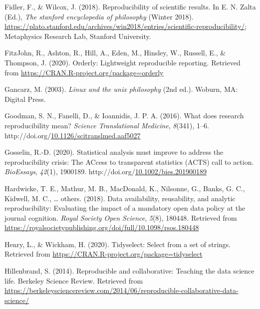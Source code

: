 \documentclass[12pt,twoside]{reedthesis}
\newenvironment{CSLReferences}%
  {}%
  {\par}
\begin{document}
\begin{CSLReferences}{1}{0}
\leavevmode\hypertarget{ref-sep-scientific-reproducibility}{}%
Fidler, F., \& Wilcox, J. (2018). Reproducibility of scientific results. In E. N. Zalta (Ed.), \emph{The stanford encyclopedia of philosophy} (Winter 2018). \url{https://plato.stanford.edu/archives/win2018/entries/scientific-reproducibility/}; Metaphysics Research Lab, Stanford University.

\leavevmode\hypertarget{ref-R-orderly}{}%
FitzJohn, R., Ashton, R., Hill, A., Eden, M., Hinsley, W., Russell, E., \& Thompson, J. (2020). Orderly: Lightweight reproducible reporting. Retrieved from \url{https://CRAN.R-project.org/package=orderly}

\leavevmode\hypertarget{ref-unix}{}%
Gancarz, M. (2003). \emph{Linux and the unix philosophy} (2nd ed.). Woburn, MA: Digital Press.

\leavevmode\hypertarget{ref-Goodman341ps12}{}%
Goodman, S. N., Fanelli, D., \& Ioannidis, J. P. A. (2016). What does research reproducibility mean? \emph{Science Translational Medicine}, \emph{8}(341), 1--6. http://doi.org/\href{https://doi.org/10.1126/scitranslmed.aaf5027}{10.1126/scitranslmed.aaf5027}

\leavevmode\hypertarget{ref-bioessays-gosselin}{}%
Gosselin, R.-D. (2020). Statistical analysis must improve to address the reproducibility crisis: The ACcess to transparent statistics (ACTS) call to action. \emph{BioEssays}, \emph{42}(1), 1900189. http://doi.org/\href{https://doi.org/10.1002/bies.201900189}{10.1002/bies.201900189}

\leavevmode\hypertarget{ref-hardwicke2018data}{}%
Hardwicke, T. E., Mathur, M. B., MacDonald, K., Nilsonne, G., Banks, G. C., Kidwell, M. C., \ldots{} others. (2018). Data availability, reusability, and analytic reproducibility: Evaluating the impact of a mandatory open data policy at the journal cognition. \emph{Royal Society Open Science}, \emph{5}(8), 180448. Retrieved from \url{https://royalsocietypublishing.org/doi/full/10.1098/rsos.180448}

\leavevmode\hypertarget{ref-R-tidyselect}{}%
Henry, L., \& Wickham, H. (2020). Tidyselect: Select from a set of strings. Retrieved from \url{https://CRAN.R-project.org/package=tidyselect}

\leavevmode\hypertarget{ref-berkeley_teaching}{}%
Hillenbrand, S. (2014). Reproducible and collaborative: Teaching the data science life. Berkeley Science Review. Retrieved from \url{https://berkeleysciencereview.com/2014/06/reproducible-collaborative-data-science/}


\end{CSLReferences}
\end{document}

